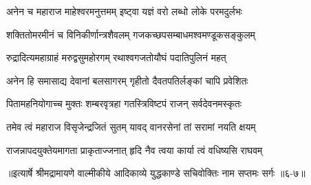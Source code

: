 \twolineshloka
{अनेन च महाराज माहेश्वरमनुत्तमम्}
{इष्ट्वा यज्ञं वरो लब्धो लोके परमदुर्लभः} %

\twolineshloka
{शक्तितोमरमीनं च विनिकीर्णान्त्रशैवलम्}
{गजकच्छपसम्बाधमश्वमण्डूकसङ्कुलम्} %

\twolineshloka
{रुद्रादित्यमहाग्राहं मरुद्वसुमहोरगम्}
{रथाश्वगजतोयौघं पदातिपुलिनं महत्} %

\twolineshloka
{अनेन हि समासाद्य देवानां बलसागरम्}
{गृहीतो दैवतपतिर्लङ्कां चापि प्रवेशितः} %

\twolineshloka
{पितामहनियोगाच्च मुक्तः शम्बरवृत्रहा}
{गतस्त्रिविष्टपं राजन् सर्वदेवनमस्कृतः} %

\twolineshloka
{तमेव त्वं महाराज विसृजेन्द्रजितं सुतम्}
{यावद् वानरसेनां तां सरामां नयति क्षयम्} %

\twolineshloka
{राजन्नापदयुक्तेयमागता प्राकृताज्जनात्}
{हृदि नैव त्वया कार्या त्वं वधिष्यसि राघवम्} %


॥इत्यार्षे श्रीमद्रामायणे वाल्मीकीये आदिकाव्ये युद्धकाण्डे सचिवोक्तिः नाम सप्तमः सर्गः ॥६-७॥
